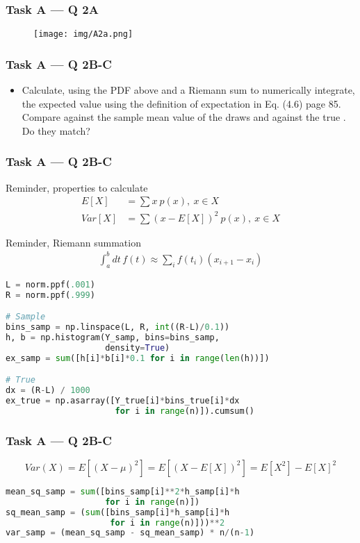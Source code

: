 \documentclass[usenames,dvipsnames]{beamer}
\begin{document}
\begin{frame}[fragile]
\frametitle{Task A --- Q 2A}
\begin{figure}
\centering
\texttt{[image: img/A2a.png]}
\end{figure}
\end{frame}



\begin{frame}
\frametitle{Task A --- Q 2B-C}
\begin{itemize}
\item Calculate, using the PDF above and a Riemann sum to numerically integrate, the expected value using the definition of expectation in Eq. (4.6) page 85. Compare against the sample mean value of the draws and against the true . Do they match?
\end{itemize}
\end{frame}


\begin{frame}[fragile]
\frametitle{Task A --- Q 2B-C}
Reminder, properties to calculate
\begin{align}
E[X]     &=\sum x\ p(x),\ x \in X \\
Var[X]   &=\sum (x - E[X])^2\ p(x),\ x \in X
\end{align}

Reminder, Riemann summation
\begin{align}
\int_a^b dt\, f(t)  \approx \sum_i f(t_i) (x_{i+1} - x_i)
\end{align}
\end{frame}

\begin{frame}[fragile]
\begin{lstlisting}[language=Python]
L = norm.ppf(.001)
R = norm.ppf(.999)

# Sample
bins_samp = np.linspace(L, R, int((R-L)/0.1))
h, b = np.histogram(Y_samp, bins=bins_samp,
                    density=True)
ex_samp = sum([h[i]*b[i]*0.1 for i in range(len(h))])

# True
dx = (R-L) / 1000
ex_true = np.asarray([Y_true[i]*bins_true[i]*dx
                      for i in range(n)]).cumsum()
\end{lstlisting}
\end{frame}

\begin{frame}[fragile]
\frametitle{Task A --- Q 2B-C}
$$Var(X) = E[(X - \mu)^2] = E[(X - E[X])^2] = E[X^2] - E[X]^2$$

\begin{lstlisting}[language=Python]
mean_sq_samp = sum([bins_samp[i]**2*h_samp[i]*h
                    for i in range(n)])
sq_mean_samp = (sum([bins_samp[i]*h_samp[i]*h
                     for i in range(n)]))**2
var_samp = (mean_sq_samp - sq_mean_samp) * n/(n-1)
\end{lstlisting}
\end{frame}
\end{document}
